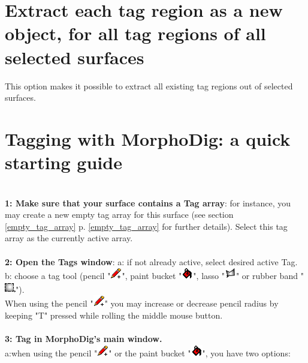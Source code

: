 \section{Extract each tag region as a new object, for all tag regions of all selected surfaces}\label{extract_tag_range_section}
This option makes it possible to extract all existing tag regions out of selected surfaces.

\section{Tagging with MorphoDig: a quick starting guide}\label{tag_starting_guide}
\textbf{\underline{}}\\
\textbf{1: Make sure that your surface contains a Tag array}: for instance, you may create a new empty tag array for this surface (see section \ref{empty_tag_array} p. \ref{empty_tag_array} for further details). Select this tag array as the currently active array.\\\\
\noindent
\textbf{2: Open the Tags window}: a: if not already active, select desired active Tag. b: choose a tag tool (pencil "\includegraphics[scale=0.7]{images/12/pencil.png}", paint bucket "\includegraphics[scale=0.7]{images/12/paint_bucket.png}", lasso "\includegraphics[scale=0.7]{images/12/lasso.png}" or rubber band "\includegraphics[scale=0.7]{images/12/rubber_band.png}").  \\
When using the pencil "\includegraphics[scale=0.7]{images/12/pencil.png}" you may increase or decrease pencil radius by keeping "T" pressed while rolling the middle mouse button.\\\\
\noindent
\textbf{3: Tag in MorphoDig's main window.} \\ a:when using the pencil "\includegraphics[scale=0.7]{images/12/pencil.png}" or the paint bucket "\includegraphics[scale=0.7]{images/12/paint_bucket.png}", you have two options:\\
